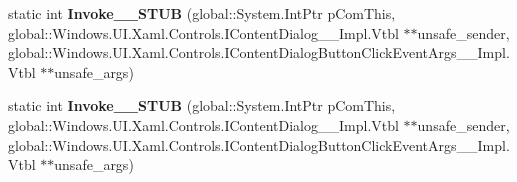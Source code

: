 \begin{DoxyCompactItemize}
\mbox{\label{struct_windows_1_1_foundation_1_1_typed_event_handler___a___windows___u_i___xaml___controls___co8b92684606b505f49919e89761d7b36c_a865e509fab8ed22086c7f60bb6396c5d}} 
static int {\bfseries Invoke\+\_\+\+\_\+\+S\+T\+UB} (global\+::\+System.\+Int\+Ptr p\+Com\+This, global\+::\+Windows.\+U\+I.\+Xaml.\+Controls.\+I\+Content\+Dialog\+\_\+\+\_\+\+Impl.\+Vtbl $\ast$$\ast$unsafe\+\_\+sender, global\+::\+Windows.\+U\+I.\+Xaml.\+Controls.\+I\+Content\+Dialog\+Button\+Click\+Event\+Args\+\_\+\+\_\+\+Impl.\+Vtbl $\ast$$\ast$unsafe\+\_\+args)
\item 
\mbox{\label{struct_windows_1_1_foundation_1_1_typed_event_handler___a___windows___u_i___xaml___controls___co8b92684606b505f49919e89761d7b36c_a865e509fab8ed22086c7f60bb6396c5d}} 
static int {\bfseries Invoke\+\_\+\+\_\+\+S\+T\+UB} (global\+::\+System.\+Int\+Ptr p\+Com\+This, global\+::\+Windows.\+U\+I.\+Xaml.\+Controls.\+I\+Content\+Dialog\+\_\+\+\_\+\+Impl.\+Vtbl $\ast$$\ast$unsafe\+\_\+sender, global\+::\+Windows.\+U\+I.\+Xaml.\+Controls.\+I\+Content\+Dialog\+Button\+Click\+Event\+Args\+\_\+\+\_\+\+Impl.\+Vtbl $\ast$$\ast$unsafe\+\_\+args)
\end{DoxyCompactItemize}
